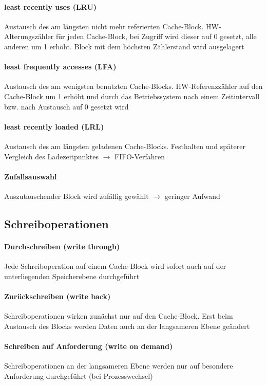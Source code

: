 \documentclass[10pt,a4paper,landscape]{article}
\begin{document}
\begin{multicols*}{3}
	\paragraph{least recently uses (LRU)} Austausch des am längsten nicht mehr referierten Cache-Block. HW-Alterungszähler für jeden Cache-Block, bei Zugriff wird dieser auf 0 gesetzt, alle anderen um 1 erhöht. Block mit dem höchsten Zählerstand wird ausgelagert
	\paragraph{least frequently accesses (LFA)} Austausch des am wenigsten benutzten Cache-Blocks. HW-Referenzzähler auf den Cache-Block um 1 erhöht und durch das Betriebssystem nach einem Zeitintervall bzw. nach Austausch auf 0 gesetzt wird
	\paragraph{least recently loaded (LRL)} Austausch des am längsten geladenen Cache-Blocks. Festhalten und späterer Vergleich des Ladezeitpunktes $\rightarrow$ FIFO-Verfahren
	\paragraph{Zufallsauswahl} Auszutauschender Block wird zufällig gewählt $\rightarrow$ geringer Aufwand
	\subsection{Schreiboperationen}
	\paragraph{Durchschreiben (write through)} Jede Schreiboperation auf einem Cache-Block wird sofort auch auf der unterliegenden Speicherebene durchgeführt
	\paragraph{Zurückschreiben (write back)} Schreiboperationen wirken zunächst nur auf den Cache-Block. Erst beim Austausch des Blocks werden Daten auch an der langsameren Ebene geändert
	\paragraph{Schreiben auf Anforderung (write on demand)} Schreiboperationen an der langsameren Ebene werden nur auf besondere Anforderung durchgeführt (bei Prozesswechsel)

\end{multicols*}
\end{document}
